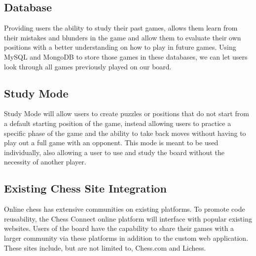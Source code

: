 \documentclass{article}
\begin{document}
\subsection{Database}
{Providing users the ability to study their past games, allows them learn from their mistakes and blunders in the game and allow them to evaluate their own positions with a better understanding on how to play in future games. 
Using MySQL and MongoDB to store those games in these databases, we can let users look through all games previously played on our board.}

\subsection{Study Mode}
{Study Mode will allow users to create puzzles or positions that do not start from a default starting position of the game, instead allowing users to practice a specific phase of the game and the ability to take back moves without having to play out a full game with an opponent. This mode is meant to be used individually, also allowing a user to use and study the board without the necessity of another player.}

\subsection{Existing Chess Site Integration}
{Online chess has extensive communities on existing platforms. To promote code reusability, the Chess Connect online platform will interface with popular existing websites.
Users of the board have the capability to share their games with a larger community via these platforms in addition to the custom web application. These sites include, but are not limited to, Chess.com and Lichess.}
\end{document}
